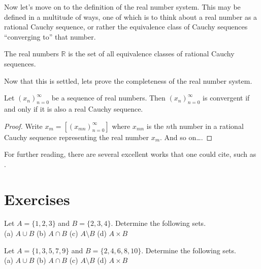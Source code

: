 \documentclass{tstextbook}
\begin{document}
	Now let's move on to the definition of the real number system. This
	may be defined in a multitude of ways, one of which is to think about
	a real number as a rational Cauchy sequence, or rather the equivalence
	class of Cauchy sequences ``converging to'' that number.
	
	\begin{definition}
		\label{def:realnumbers}
		The real numbers $\mathbb{R}$ is the set of all equivalence classes
		of rational Cauchy sequences.
	\end{definition}
	
	Now that this is settled, lets prove the completeness of the real
	number system.
	
	\begin{theorem}
		\label{th:realnumberscomplete}
		Let $(x_n)_{n=0}^{\infty}$ be a sequence of real numbers.
		Then $(x_n)_{n=0}^{\infty}$ is convergent if and only if
		it is also a real Cauchy sequence.
	\end{theorem}
	\begin{proof}
		Write $x_m = [(x_{mn})_{n=0}^{\infty}]$ where
		$x_{mn}$ is the $n$th number in a rational Cauchy sequence
		representing the real number $x_m$. And so on\ldots.
	\end{proof}
	
	For further reading, there are several excellent works that one could
	cite, such as \cite{Tao2006,Turing1936}.
	
	\section*{Exercises}
	
	\begin{exercise}
		Let $A = \{1, 2, 3\}$ and $B = \{2, 3, 4\}$.
		Determine the following sets. \\
		(a) $A \cup B$ \quad
		(b) $A \cap B$ \quad
		(c) $A \setminus B$ \quad
		(d) $A \times B$
	\end{exercise}
	
	\begin{exercise}
		Let $A = \{1, 3, 5, 7, 9\}$ and $B = \{2, 4, 6, 8, 10\}$.
		Determine the following sets. \\
		(a) $A \cup B$ \quad
		(b) $A \cap B$ \quad
		(c) $A \setminus B$ \quad
		(d) $A \times B$
	\end{exercise}
	
\end{document}
